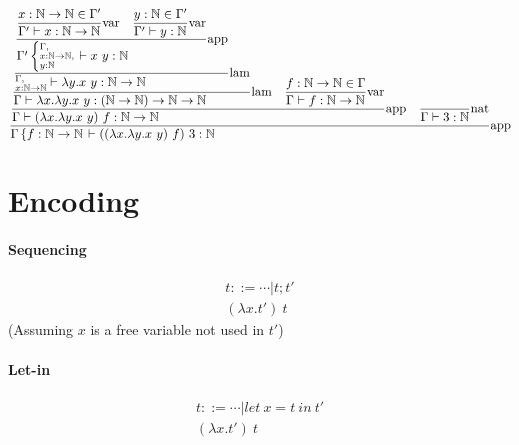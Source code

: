 \documentclass{article}
\newcommand{\st}[3][]{\ensuremath{\displaystyle\frac{#3\hfill}{#2\hfill} \text{#1}}}
\newcommand{\N}{\ensuremath \mathbb N}
\newcommand{\lam}[2]{\ensuremath{\lambda#1.#2}}
\begin{document}
\begin{equation*}
    \st[app]{
        \Gamma\left\{f:\N\to\N\right. \vdash ((\lam{x}{\lam{y}{x\ y}})\ f)\ 3:\N
    }{
        \st[app]{
            \Gamma\vdash (\lam{x}{\lam{y}{x\ y}})\ f: \N\to\N
        }{
            \st[lam]{
                \Gamma\vdash \lam{x}{\lam{y}{x\ y}}: (\N\to\N)\to\N\to\N
            }{
                \st[lam]{
                    \substack{\Gamma,\hfill\\x:\N\to\N}\vdash \lam{y}{x\ y}:\N\to\N
                }{
                    \st[app]{
                        \Gamma' \left\{ \substack{\Gamma,\hfill\\x:\N\to\N,\\y:\N\hfill} \right. \vdash x\ y:\N
                    }{
                        \st[var]{
                            \Gamma'\vdash x:\N\to\N
                        }{
                            x:\N\to\N\in\Gamma'
                        }
                        \quad
                        \st[var]{
                            \Gamma'\vdash y:\N
                        }{
                            y:\N\in\Gamma'
                        }
                    }
                }
            }
            \quad
            \st[var]{
                \Gamma\vdash f:\N\to\N
            }{
                f:\N\to\N\in\Gamma
            }
        }
        \quad
        \st[nat]{
            \Gamma\vdash 3:\N
        }{
        }
    }
\end{equation*}

\section{Encoding}
\paragraph{Sequencing}
\begin{gather*}
    t ::= \cdots | t;t' \\
    (\lam{x}{t'})\ t
\end{gather*}
(Assuming $x$ is a free variable not used in $t'$)

\paragraph{Let-in}
\begin{gather*}
    t ::= \cdots | let\ x=t\ in\ t' \\
    (\lam{x}{t'})\ t
\end{gather*}
\end{document}
